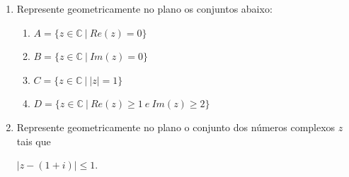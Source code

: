 \documentclass[a4paper,5pt]{amsbook}
\begin{document}
\begin{enumerate}
	\vspace{0.5cm}
	\item Represente geometricamente no plano os conjuntos abaixo:
		\begin{enumerate}
			\item $A=\{z\in\mathbb{C}\ |\ Re(z)=0\}$
			\item $B=\{z\in\mathbb{C}\ |\ Im(z)=0\}$
			\item $C=\{z\in\mathbb{C}\ |\ |z|=1\}$
			\item $D=\{z\in\mathbb{C}\ |\ Re(z)\ge 1\ e\ Im(z)\ge 2\}$
		\end{enumerate}

	\vspace{0.5cm}
	\item Represente geometricamente no plano o conjunto dos n\'umeros complexos
		$z$ tais que

		\noindent{}$|z-(1+i)| \le 1$.
\end{enumerate}
\end{document}
